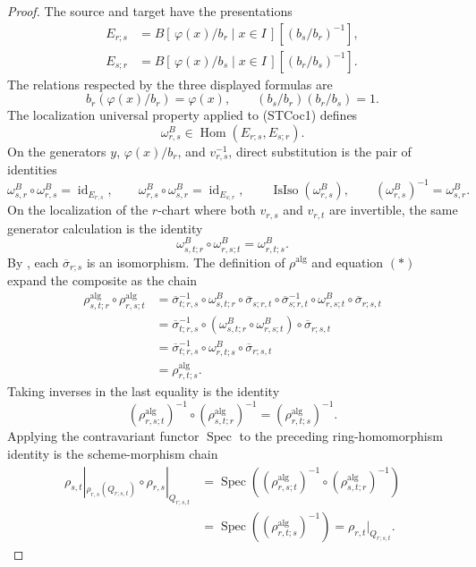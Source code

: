 \begin{proof}
  The source and target have the presentations
  \[
  \begin{aligned}
    E_{r;s}
      &=B[\,\varphi(x)/b_r\mid x\in I\,]
          [(b_s/b_r)^{-1}],\\
    E_{s;r}
      &=B[\,\varphi(x)/b_s\mid x\in I\,]
          [(b_r/b_s)^{-1}].
  \end{aligned}
  \]
  The relations respected by the three displayed formulas are
  \[
    b_r(\varphi(x)/b_r)=\varphi(x),\qquad
    (b_s/b_r)(b_r/b_s)=1.                                  \tag{STCoc1}
  \]
  The localization universal property applied to (STCoc1) defines
  \[
    \omega^B_{r,s}\in\operatorname{Hom}(E_{r;s},E_{s;r}).
  \]
  On the
  generators $y$, $\varphi(x)/b_r$, and $v_{r,s}^{-1}$, direct substitution
  is the pair of identities
  \[
    \omega^B_{s,r}\circ\omega^B_{r,s}=\operatorname{id}_{E_{r;s}},
    \qquad
    \omega^B_{r,s}\circ\omega^B_{s,r}=\operatorname{id}_{E_{s;r}},
    \qquad
    \operatorname{IsIso}(\omega^B_{r,s}),
    \qquad
    (\omega^B_{r,s})^{-1}=\omega^B_{s,r}.                    \tag{STCoc2}
  \]
  On the localization of
  the $r$-chart where both $v_{r,s}$ and $v_{r,t}$ are invertible, the same
  generator calculation is the identity
  \[
    \omega^B_{s,t;r}\circ\omega^B_{r,s;t}
      =\omega^B_{r,t;s}.                                          \tag{*}
  \]
  By , each
  $\overline\sigma_{r;s}$ is an isomorphism.  The definition of
  $\rho^{\mathrm{alg}}$ and equation $(*)$ expand the composite as the chain
  \[
  \begin{aligned}
    \rho^{\mathrm{alg}}_{s,t;r}\circ\rho^{\mathrm{alg}}_{r,s;t}
      &=\overline\sigma_{t;r,s}^{-1}\circ\omega^B_{s,t;r}
          \circ\overline\sigma_{s;r,t}
          \circ\overline\sigma_{s;r,t}^{-1}
          \circ\omega^B_{r,s;t}\circ\overline\sigma_{r;s,t}\\
      &=\overline\sigma_{t;r,s}^{-1}\circ
          (\omega^B_{s,t;r}\circ\omega^B_{r,s;t})
          \circ\overline\sigma_{r;s,t}\\
      &=\overline\sigma_{t;r,s}^{-1}\circ\omega^B_{r,t;s}
          \circ\overline\sigma_{r;s,t}\\
      &=\rho^{\mathrm{alg}}_{r,t;s}.
  \end{aligned}
  \]
  Taking inverses in the last equality is the identity
  \[
    (\rho^{\mathrm{alg}}_{r,s;t})^{-1}\circ
      (\rho^{\mathrm{alg}}_{s,t;r})^{-1}
      =(\rho^{\mathrm{alg}}_{r,t;s})^{-1}.
  \]
  Applying the contravariant functor $\operatorname{Spec}$ to the preceding
  ring-homomorphism identity is the scheme-morphism chain
  \[
  \begin{aligned}
    \rho_{s,t}|_{\rho_{r,s}(Q_{r;s,t})}\circ
      \rho_{r,s}|_{Q_{r;s,t}}
      &=\operatorname{Spec}\!\left(
          (\rho^{\mathrm{alg}}_{r,s;t})^{-1}\circ
          (\rho^{\mathrm{alg}}_{s,t;r})^{-1}\right)\\
      &=\operatorname{Spec}\!\left(
          (\rho^{\mathrm{alg}}_{r,t;s})^{-1}\right)
       =\rho_{r,t}|_{Q_{r;s,t}}.
  \end{aligned}
  \]
\end{proof}

